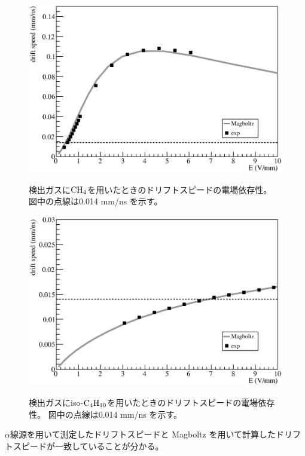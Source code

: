 \begin{figure}
  \centering
  \includegraphics[clip, width=0.9\columnwidth]{eps/drift_v_CH4.eps}
  \caption[検出ガスに${\rm CH_{4}}$を用いたときのドリフトスピードの電場依存性。]
          {検出ガスに${\rm CH_{4}}$を用いたときのドリフトスピードの電場依存性。
            図中の点線は0.014 mm/ns を示す。}
  \label{fig::drift_v_CH4}
  \caption{}
  \label{fig::drift_v_CH4_H2}
  \caption{}
  \label{fig::drift_v_CH4_He}
  \includegraphics[clip, width=0.9\columnwidth]{eps/drift_v_iC4H10_H2.eps}
  \caption[検出ガスにiso-${\rm C_{4}H_{10}}$を用いたときのドリフトスピードの電場依存性。]
          {検出ガスにiso-${\rm C_{4}H_{10}}$を用いたときのドリフトスピードの電場依存性。
            図中の点線は0.014 mm/ns を示す。}
  \label{fig::drift_v_iC4H10_H2}
  \caption{}
  \label{fig::drift_v_iC4H10_He}
\end{figure}
$\alpha$線源を用いて測定したドリフトスピードと Magboltz を用いて計算したドリフトスピードが一致していることが分かる。

